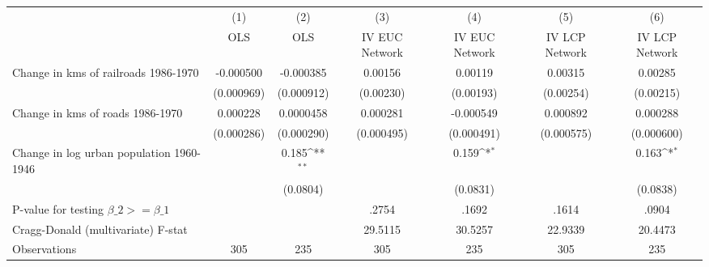 {
\def\sym#1{\ifmmode^{#1}\else\(^{#1}\)\fi}
\begin{tabular}{l*{6}{c}}
\hline\hline
                &\multicolumn{1}{c}{(1)}&\multicolumn{1}{c}{(2)}&\multicolumn{1}{c}{(3)}&\multicolumn{1}{c}{(4)}&\multicolumn{1}{c}{(5)}&\multicolumn{1}{c}{(6)}\\
                &\multicolumn{1}{c}{OLS}&\multicolumn{1}{c}{OLS}&\multicolumn{1}{c}{IV EUC Network}&\multicolumn{1}{c}{IV EUC Network}&\multicolumn{1}{c}{IV LCP Network}&\multicolumn{1}{c}{IV LCP Network}\\
\hline
Change in kms of railroads 1986-1970&-0.000500         &-0.000385         &  0.00156         &  0.00119         &  0.00315         &  0.00285         \\
                &(0.000969)         &(0.000912)         &(0.00230)         &(0.00193)         &(0.00254)         &(0.00215)         \\
[1em]
Change in kms of roads 1986-1970& 0.000228         &0.0000458         & 0.000281         &-0.000549         & 0.000892         & 0.000288         \\
                &(0.000286)         &(0.000290)         &(0.000495)         &(0.000491)         &(0.000575)         &(0.000600)         \\
[1em]
Change in log urban population 1960-1946&                  &    0.185\sym{**} &                  &    0.159\sym{*}  &                  &    0.163\sym{*}  \\
                &                  & (0.0804)         &                  & (0.0831)         &                  & (0.0838)         \\
\hline
P-value for testing $\beta\_{2} >= \beta\_{1}$&                  &                  &    .2754         &    .1692         &    .1614         &    .0904         \\
Cragg-Donald (multivariate) F-stat&                  &                  &  29.5115         &  30.5257         &  22.9339         &  20.4473         \\
Observations    &      305         &      235         &      305         &      235         &      305         &      235         \\
\hline\hline
\end{tabular}
}

